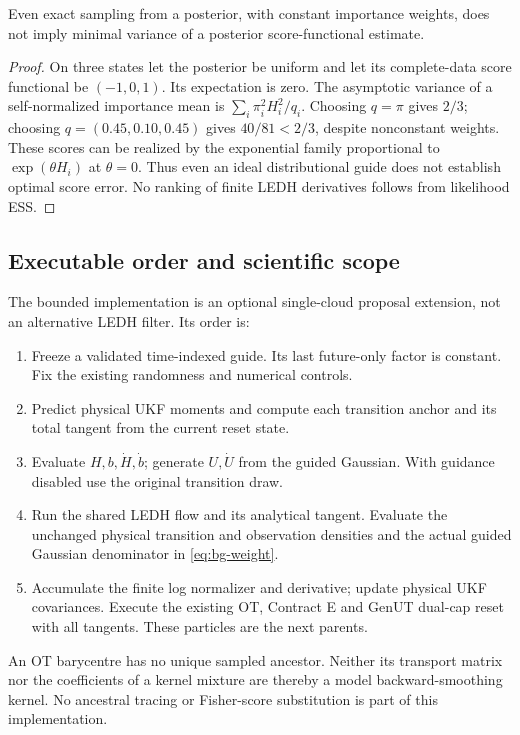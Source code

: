 \begin{proposition}
\label{prop:bg-no-ranking}
Even exact sampling from a posterior, with constant importance weights,
does not imply minimal variance of a posterior score-functional estimate.
\end{proposition}
\begin{proof}
On three states let the posterior be uniform and let its complete-data
score functional be $(-1,0,1)$. Its expectation is zero. The asymptotic
variance of a self-normalized importance mean is
$\sum_i\pi_i^2 H_i^2/q_i$. Choosing $q=\pi$ gives $2/3$; choosing
$q=(0.45,0.10,0.45)$ gives $40/81<2/3$, despite nonconstant weights.
These scores can be realized by the exponential family proportional to
$\exp(\theta H_i)$ at $\theta=0$. Thus even an ideal distributional
guide does not establish optimal score error. No ranking of finite LEDH
derivatives follows from likelihood ESS.
\end{proof}

\subsection{Executable order and scientific scope}

The bounded implementation is an optional single-cloud proposal extension,
not an alternative LEDH filter. Its order is:
\begin{enumerate}[nosep]
\item Freeze a validated time-indexed guide. Its last future-only factor
      is constant. Fix the existing randomness and numerical controls.
\item Predict physical UKF moments and compute each transition anchor and
      its total tangent from the current reset state.
\item Evaluate $H,b,\dot H,\dot b$; generate $U,\dot U$ from the guided
      Gaussian. With guidance disabled use the original transition draw.
\item Run the shared LEDH flow and its analytical tangent. Evaluate the
      unchanged physical transition and observation densities and the
      actual guided Gaussian denominator in \eqref{eq:bg-weight}.
\item Accumulate the finite log normalizer and derivative; update physical
      UKF covariances. Execute the existing OT, Contract E and GenUT
      dual-cap reset with all tangents. These particles are the next parents.
\end{enumerate}
An OT barycentre has no unique sampled ancestor. Neither its transport
matrix nor the coefficients of a kernel mixture are thereby a model
backward-smoothing kernel. No ancestral tracing or Fisher-score substitution
is part of this implementation.

